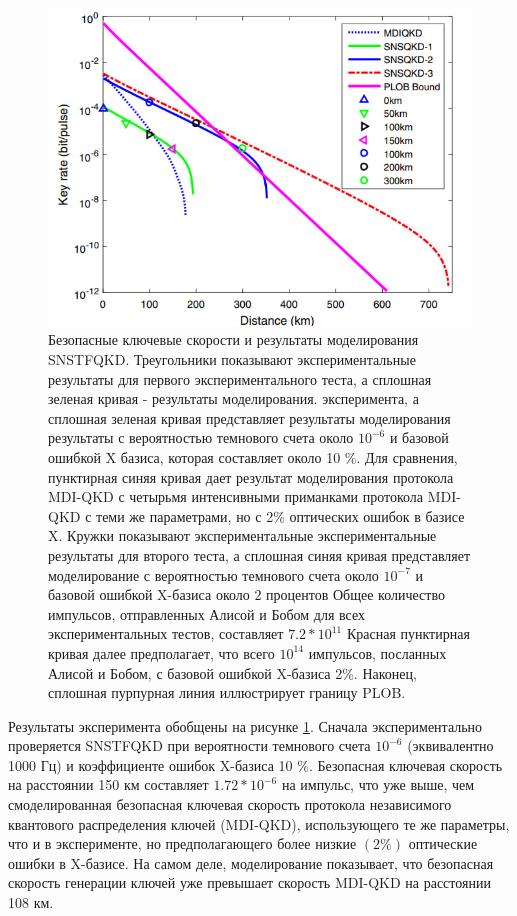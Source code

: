  \begin{figure}
     \centering
     \includegraphics{images/TF key rate lit.jpg}
     \caption{Безопасные ключевые скорости и результаты моделирования SNSTFQKD.
Треугольники показывают экспериментальные результаты для первого экспериментального теста, а сплошная зеленая кривая - результаты моделирования. эксперимента, а сплошная зеленая кривая представляет результаты моделирования
результаты с вероятностью темнового счета около $10^{-6}$ и базовой ошибкой X базиса,  которая составляет около 10 \%. Для сравнения, пунктирная синяя кривая дает результат моделирования протокола MDI-QKD с четырьмя интенсивными приманками протокола MDI-QKD с теми же параметрами, но с
2\% оптических ошибок в базисе X. Кружки показывают экспериментальные экспериментальные результаты для второго теста, а сплошная синяя кривая представляет моделирование с вероятностью темнового счета около
$10^{-7}$ и базовой ошибкой X-базиса около 2 процентов  Общее количество
импульсов, отправленных Алисой и Бобом для всех экспериментальных тестов, составляет
$7.2*10^{11}$ Красная пунктирная кривая далее предполагает, что всего $10^{14}$ импульсов, посланных Алисой и Бобом, с базовой ошибкой X-базиса 2\%. Наконец, сплошная пурпурная линия иллюстрирует границу PLOB.}
     \label{fig:TF key rate lit}
 \end{figure}
 Результаты эксперимента обобщены на рисунке \ref{fig:TF key rate lit}. Сначала экспериментально проверяется SNSTFQKD при вероятности темнового счета $10^{-6}$ (эквивалентно 1000 Гц) и коэффициенте ошибок X-базиса 10 \%. Безопасная ключевая скорость на расстоянии 150 км составляет $1.72*10^{-6}$  на импульс, что уже выше, чем смоделированная безопасная ключевая скорость протокола независимого квантового распределения ключей (MDI-QKD), использующего те же параметры, что и в эксперименте, но предполагающего более низкие $(2\%)$ оптические ошибки в X-базисе. На самом деле, моделирование показывает, что безопасная скорость генерации ключей уже превышает скорость MDI-QKD на расстоянии 108 км.
